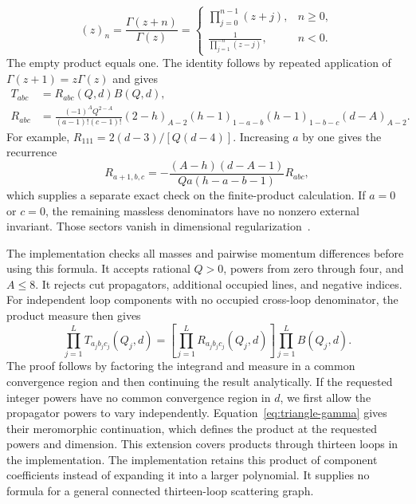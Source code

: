 \begin{equation}
 (z)_n=\frac{\Gamma(z+n)}{\Gamma(z)}=
 \begin{cases}
 \prod_{j=0}^{n-1}(z+j),&n\geq0,\\
 \displaystyle\frac{1}{\prod_{j=1}^{-n}(z-j)},&n<0.
 \end{cases}
 \label{eq:triangle-pochhammer}
\end{equation}
The empty product equals one. The identity follows by repeated application of $\Gamma(z+1)=z\Gamma(z)$ and gives
\begin{align}
 T_{abc}&=R_{abc}(Q,d)B(Q,d),\\
 R_{abc}&=\frac{(-1)^A Q^{2-A}}{(a-1)!(c-1)!}
 (2-h)_{A-2}(h-1)_{1-a-b}(h-1)_{1-b-c}(d-A)_{A-2}.
 \label{eq:triangle-rational}
\end{align}
For example, $R_{111}=2(d-3)/[Q(d-4)]$. Increasing $a$ by one gives the recurrence
\begin{equation}
 R_{a+1,b,c}=-\frac{(A-h)(d-A-1)}{Qa(h-a-b-1)}R_{abc},
 \label{eq:triangle-recurrence}
\end{equation}
which supplies a separate exact check on the finite-product calculation. If $a=0$ or $c=0$, the remaining massless denominators have no nonzero external invariant. Those sectors vanish in dimensional regularization~\cite{Weinzierl2022}.

The implementation checks all masses and pairwise momentum differences before using this formula. It accepts rational $Q>0$, powers from zero through four, and $A\leq8$. It rejects cut propagators, additional occupied lines, and negative indices. For independent loop components with no occupied cross-loop denominator, the product measure then gives
\begin{equation}
 \prod_{j=1}^{L}T_{a_jb_jc_j}(Q_j,d)
 =\left[\prod_{j=1}^{L}R_{a_jb_jc_j}(Q_j,d)\right]
 \prod_{j=1}^{L}B(Q_j,d).
 \label{eq:triangle-product}
\end{equation}
The proof follows by factoring the integrand and measure in a common convergence region and then continuing the result analytically. If the requested integer powers have no common convergence region in $d$, we first allow the propagator powers to vary independently. Equation~\eqref{eq:triangle-gamma} gives their meromorphic continuation, which defines the product at the requested powers and dimension. This extension covers products through thirteen loops in the implementation. The implementation retains this product of component coefficients instead of expanding it into a larger polynomial. It supplies no formula for a general connected thirteen-loop scattering graph.
